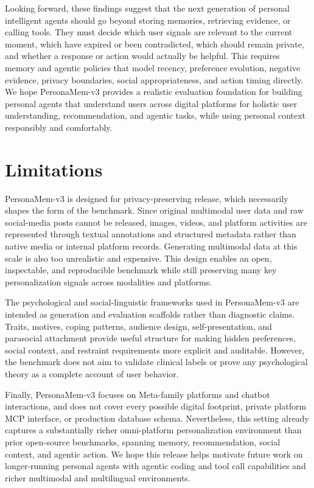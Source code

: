 \documentclass[]{fairmeta}
\begin{document}
Looking forward, these findings suggest that the next generation of personal intelligent agents should go beyond storing memories, retrieving evidence, or calling tools. They must decide which user signals are relevant to the current moment, which have expired or been contradicted, which should remain private, and whether a response or action would actually be helpful. This requires memory and agentic policies that model recency, preference evolution, negative evidence, privacy boundaries, social appropriateness, and action timing directly. We hope PersonaMem-v3 provides a realistic evaluation foundation for building personal agents that understand users across digital platforms for holistic user understanding, recommendation, and agentic tasks, while using personal context responsibly and comfortably.

\section{Limitations}
\label{section}

PersonaMem-v3 is designed for privacy-preserving release, which necessarily shapes the form of the benchmark. Since original multimodal user data and raw social-media posts cannot be released, images, videos, and platform activities are represented through textual annotations and structured metadata rather than native media or internal platform records. Generating multimodal data at this scale is also too unrealistic and expensive. This design enables an open, inspectable, and reproducible benchmark while still preserving many key personalization signals across modalities and platforms.

The psychological and social-linguistic frameworks used in PersonaMem-v3 are intended as generation and evaluation scaffolds rather than diagnostic claims. Traits, motives, coping patterns, audience design, self-presentation, and parasocial attachment provide useful structure for making hidden preferences, social context, and restraint requirements more explicit and auditable. However, the benchmark does not aim to validate clinical labels or prove any psychological theory as a complete account of user behavior.

Finally, PersonaMem-v3 focuses on Meta-family platforms and chatbot interactions, and does not cover every possible digital footprint, private platform MCP interface, or production database schema. Nevertheless, this setting already captures a substantially richer omni-platform personalization environment than prior open-source benchmarks, spanning memory, recommendation, social context, and agentic action. We hope this release helps motivate future work on longer-running personal agents with agentic coding and tool call capabilities and richer multimodal and multilingual environments.

\clearpage
\newpage



\end{document}
